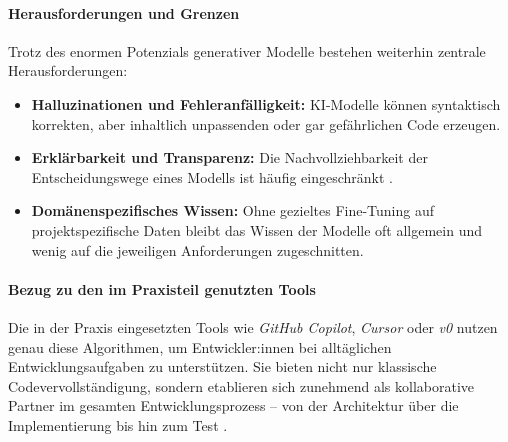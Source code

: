 \paragraph{Herausforderungen und Grenzen}

Trotz des enormen Potenzials generativer Modelle bestehen weiterhin zentrale
Herausforderungen:
\begin{itemize}
    \item \textbf{Halluzinationen und Fehleranfälligkeit:} KI-Modelle können syntaktisch korrekten, aber inhaltlich unpassenden oder gar gefährlichen Code erzeugen.
    \item \textbf{Erklärbarkeit und Transparenz:} Die Nachvollziehbarkeit der Entscheidungswege eines Modells ist häufig eingeschränkt \cite{esposito_generative_2025, nguyen-duc_generative_2023}.
    \item \textbf{Domänenspezifisches Wissen:} Ohne gezieltes Fine-Tuning auf projektspezifische Daten bleibt das Wissen der Modelle oft allgemein und wenig auf die jeweiligen Anforderungen zugeschnitten.
\end{itemize}

\paragraph{Bezug zu den im Praxisteil genutzten Tools}

Die in der Praxis eingesetzten Tools wie \textit{GitHub Copilot},
\textit{Cursor} oder \textit{v0} nutzen genau diese Algorithmen, um
Entwickler:innen bei alltäglichen Entwicklungsaufgaben zu unterstützen. Sie
bieten nicht nur klassische Codevervollständigung, sondern etablieren sich
zunehmend als kollaborative Partner im gesamten Entwicklungsprozess – von der
Architektur über die Implementierung bis hin zum Test
\cite{esposito_generative_2025, nguyen-duc_generative_2023}.

